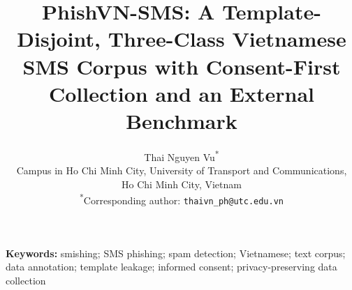 \documentclass[11pt,a4paper]{article}
\title{\textbf{PhishVN-SMS: A Template-Disjoint, Three-Class Vietnamese SMS Corpus with
Consent-First Collection and an External Benchmark}}
\author{Thai Nguyen Vu\textsuperscript{*}\FILL{co-authors: annotators, recruiter}\\
\normalsize Campus in Ho Chi Minh City, University of Transport and Communications,\\
\normalsize Ho Chi Minh City, Vietnam\\
\normalsize \textsuperscript{*}Corresponding author: \texttt{thaivn\_ph@utc.edu.vn}}
\date{}
\begin{document}
\maketitle

\noindent\textbf{Keywords:} smishing; SMS phishing; spam detection; Vietnamese; text corpus;
data annotation; template leakage; informed consent; privacy-preserving data collection














\end{document}
